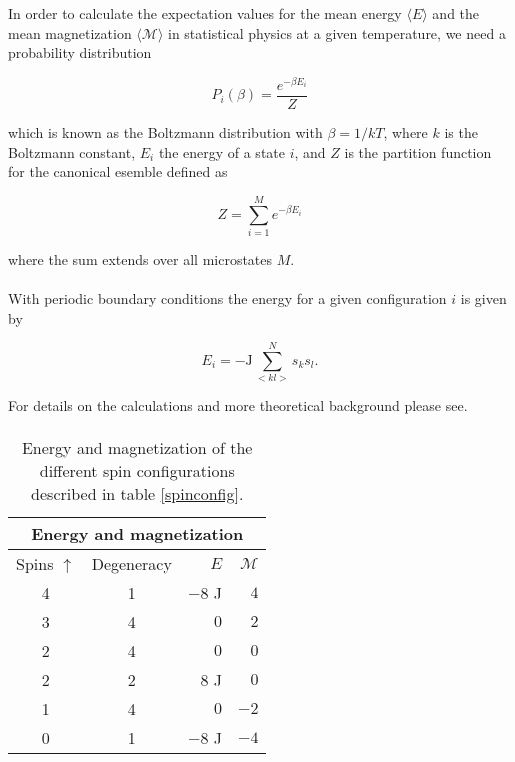 \documentclass[a4paper, fontsize=11pt]{article}
\begin{document}
In order to calculate the expectation values for the mean energy $\langle E \rangle$ and the mean magnetization $\langle \mathcal{M} \rangle$ in statistical physics at a given temperature, we need a probability distribution

\begin{equation}
P_{i}(\beta) = \dfrac{e^{-\beta E_{i}}}{Z}
\end{equation}

which is known as the Boltzmann distribution with $\beta = 1/kT$, where $k$ is the Boltzmann constant, $E_{i}$ the energy of a state $i$, and $Z$ is the partition function for the canonical esemble defined as 

\begin{equation}
Z = \sum^M_{i=1} e^{-\beta E_{i}}
\end{equation}

where the sum extends over all microstates $M$. 

\paragraph{}
With periodic boundary conditions the energy for a given configuration $i$ is given by

\begin{equation}
E_{i} = - \text{J} \sum^N_{<kl>} s_{k} s_{l}. 
\end{equation}

For details on the calculations and more theoretical background please see. \cite{H-Jensen}

\paragraph{}

\begin{table}[h!]
\centering
\begin{tabular}{|c||c|r|r|}
\toprule
\multicolumn{4}{c}{Energy and magnetization}
\\ \hline
Spins $\uparrow$ & Degeneracy & $E$ & $\mathcal{M}$
\tabularnewline
\hline
4 & 1 & $-8$ J & $4$
\tabularnewline \hline
3 & 4 & $0$ & $2$
\tabularnewline \hline
2 & 4 & $0$  & $0$
\tabularnewline \hline
2 & 2 & $8$ J & $0$
\tabularnewline \hline
1 & 4 & $0$  & $-2$
\tabularnewline \hline
0 & 1 & $-8$ J & $-4$
\tabularnewline \hline
\end{tabular}
\caption{Energy and magnetization of the different spin configurations described in table \ref{spinconfig}.}
\label{EM}
\end{table}
\end{document}
